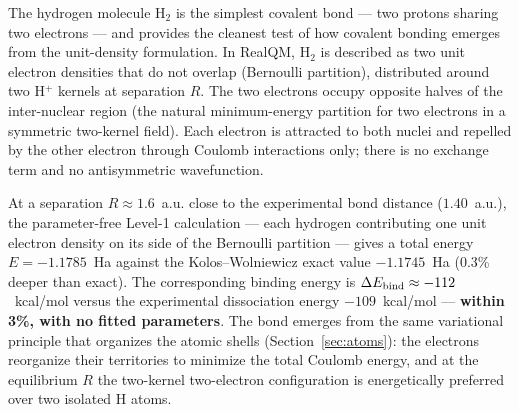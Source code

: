 \documentclass[11pt]{article}
\begin{document}
The hydrogen molecule H$_2$ is the simplest covalent bond --- two protons sharing two electrons --- and provides the cleanest test of how covalent bonding emerges from the unit-density formulation. In RealQM, H$_2$ is described as two unit electron densities that do not overlap (Bernoulli partition), distributed around two H$^+$ kernels at separation $R$. The two electrons occupy opposite halves of the inter-nuclear region (the natural minimum-energy partition for two electrons in a symmetric two-kernel field). Each electron is attracted to both nuclei and repelled by the other electron through Coulomb interactions only; there is no exchange term and no antisymmetric wavefunction.

At a separation $R \approx 1.6$~a.u. close to the experimental bond distance ($1.40$~a.u.), the parameter-free Level-1 calculation --- each hydrogen contributing one unit electron density on its side of the Bernoulli partition --- gives a total energy $E = -1.1785$~Ha against the Kolos--Wolniewicz exact value $-1.1745$~Ha (0.3\% deeper than exact). The corresponding binding energy is $\Delta E_{\rm bind} \approx -112$~kcal/mol versus the experimental dissociation energy $-109$~kcal/mol --- \textbf{within 3\%, with no fitted parameters}. The bond emerges from the same variational principle that organizes the atomic shells (Section~\ref{sec:atoms}): the electrons reorganize their territories to minimize the total Coulomb energy, and at the equilibrium $R$ the two-kernel two-electron configuration is energetically preferred over two isolated H atoms.
\end{document}
